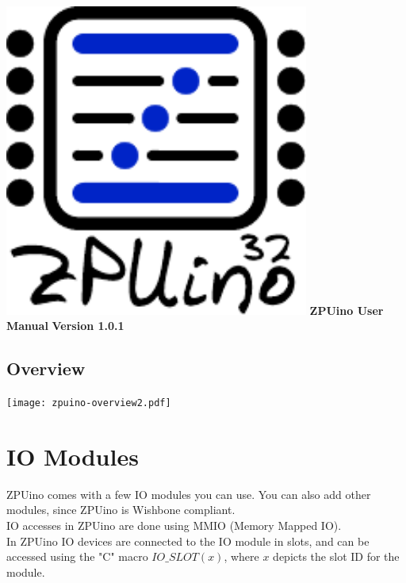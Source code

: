 \documentclass[12pt,a4paper,openany,smallheadings,headinclude,headsepline,final]{scrreprt}
\begin{document}
\pagestyle{headings}

\parindent 0cm
\parskip 0.2cm

\begin{titlepage}
\begin{center}
\includegraphics[width=10cm]{zpuino32.pdf}
\huge{\bfseries{ZPUino User Manual}}
\large{\bfseries{Version 1.0.1}}
\end{center}

\end{titlepage}

\tableofcontents
\clearpage




%
\section{Overview}
\texttt{[image: zpuino-overview2.pdf]}



\chapter{IO Modules}
ZPUino comes with a few IO modules you can use. You can also add other modules, since ZPUino is Wishbone compliant.\\
IO accesses in ZPUino are done using MMIO (Memory Mapped IO).\\
In ZPUino IO devices are connected to the IO module in slots, and can be accessed using the "C" macro $IO\_SLOT(x)$, where $x$
depicts the slot ID for the module.\\
\end{document}
